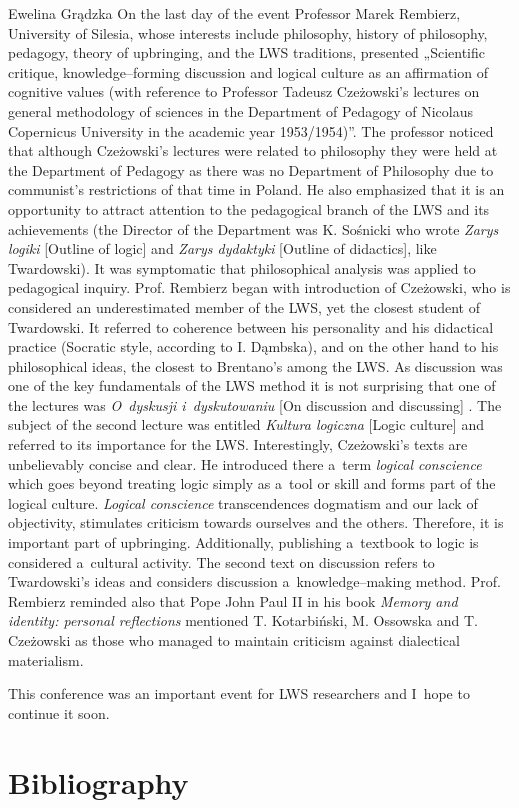 \begin{editorialeng}{Ewelina Grądzka}
On the last day of the event Professor Marek Rembierz, University of Silesia, whose interests include philosophy, history of philosophy, pedagogy, theory of upbringing, and the LWS traditions, presented „Scientific critique, knowledge--forming discussion and logical culture as an affirmation of cognitive values (with reference to Professor Tadeusz Czeżowski’s lectures on general methodology of sciences in the Department of Pedagogy of Nicolaus Copernicus University in the academic year 1953/1954)”. The professor noticed that although Czeżowski’s lectures were related to philosophy they were held at the Department of Pedagogy as there was no Department of Philosophy due to communist’s restrictions of that time in Poland. He also emphasized that it is an opportunity to attract attention to the pedagogical branch of the LWS and its achievements (the Director of the Department was K. Sośnicki who wrote \textit{Zarys logiki} [Outline of logic] and \textit{Zarys dydaktyki} [Outline of didactics], like Twardowski). It was symptomatic that philosophical analysis was applied to pedagogical inquiry. Prof. Rembierz began with introduction of Czeżowski, who is considered an underestimated member of the LWS, yet the closest student of Twardowski. It referred to coherence between his personality and his didactical practice (Socratic style, according to I. Dąmbska), and on the other hand to his philosophical ideas, the closest to Brentano’s among the LWS. As discussion was one of the key fundamentals of the LWS method it is not surprising that one of the lectures was \textit{O~dyskusji i~dyskutowaniu} [On discussion and discussing]
\parencite[][]{czezowski_o_1969}. %
 The subject of the second lecture was entitled \textit{Kultura logiczna} [Logic culture] 
\parencite[][]{czezowski_kultura_1969} %
 and referred to its importance for the LWS. Interestingly, Czeżowski’s texts are unbelievably concise and clear. He introduced there a~term \textit{logical conscience} which goes beyond treating logic simply as a~tool or skill and forms part of the logical culture. \textit{Logical conscience} transcendences dogmatism and our lack of objectivity, stimulates criticism towards ourselves and the others. Therefore, it is important part of upbringing. Additionally, publishing a~textbook to logic is considered a~cultural activity. The second text on discussion refers to Twardowski’s ideas and considers discussion a~knowledge--making method. Prof. Rembierz reminded also that Pope John Paul II in his book \textit{Memory and identity: personal reflections} 
\parencite[][]{john_paul_ii_memory_2005} %
 mentioned T. Kotarbiński, M. Ossowska and T. Czeżowski as those who managed to maintain criticism against dialectical materialism.

This conference was an important event for LWS researchers and I~hope to continue it soon.

\section*{Bibliography}%
		\printbibliography[heading=none]\nopagebreak[4]

\end{editorialeng}
